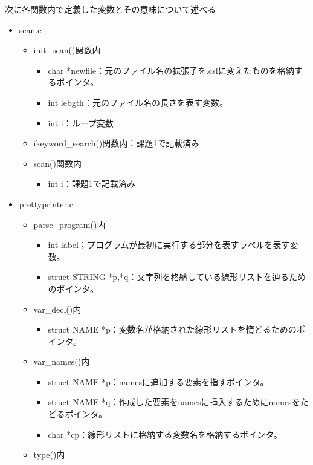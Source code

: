 \documentclass{jarticle}
\begin{document}
次に各関数内で定義した変数とその意味について述べる

\begin{itemize}
  \item scan.c
  \begin{itemize}
    \item init\_scan()関数内
    \begin{itemize}
      \item char *newfile：元のファイル名の拡張子を.cslに変えたものを格納するポインタ。
      \item int lebgth：元のファイル名の長さを表す変数。
      \item int i：ループ変数
    \end{itemize}
    \item ikeyword\_search()関数内：課題1で記載済み
    \item scan()関数内
    \begin{itemize}
      \item int i：課題1で記載済み
    \end{itemize}
  \end{itemize}
  \item prettyprinter.c
  \begin{itemize}
    \item parse\_program()内
    \begin{itemize}
      \item int label；プログラムが最初に実行する部分を表すラベルを表す変数。
      \item struct STRING *p,*q：文字列を格納している線形リストを辿るためのポインタ。
    \end{itemize}
    \item var\_decl()内
    \begin{itemize}
      \item struct NAME *p：変数名が格納された線形リストを惰どるためのポインタ。
    \end{itemize}
    \item var\_names()内
    \begin{itemize}
      \item struct NAME *p：namesに追加する要素を指すポインタ。
      \item struct NAME *q：作成した要素をnamesに挿入するためにnamesをたどるポインタ。
      \item char *cp：線形リストに格納する変数名を格納するポインタ。
    \end{itemize}
    \item type()内
    \begin{itemize}

\end{itemize}
\end{itemize}
\end{itemize}
\end{document}
